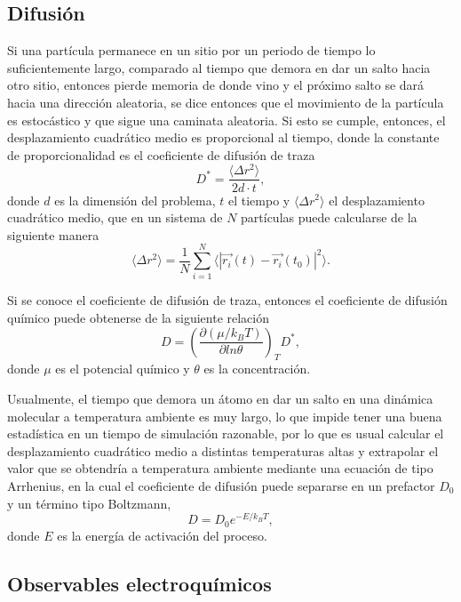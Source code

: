 \subsection{Difusión}

Si una partícula permanece en un sitio por un periodo de tiempo lo 
suficientemente largo, comparado al tiempo que demora en dar un salto hacia otro
sitio, entonces pierde memoria de donde vino y el próximo salto se dará hacia 
una dirección aleatoria, se dice entonces que el movimiento de la partícula es 
estocástico y que sigue una caminata aleatoria. Si esto se cumple, entonces, el 
desplazamiento cuadrático medio es proporcional al tiempo, donde la constante de 
proporcionalidad es el coeficiente de difusión de traza
\begin{equation}
    D^{*} = \frac{\langle \Delta r^2 \rangle}{2d\cdot t},
\end{equation}
donde $d$ es la dimensión del problema, $t$ el tiempo y 
$\langle \Delta r^2 \rangle$ el desplazamiento cuadrático medio, que en un 
sistema de $N$ partículas puede calcularse de la siguiente manera
\begin{equation}
    \langle \Delta r^2 \rangle = \frac{1}{N} \sum_{i=1}^{N} \langle |\vec{r_i}(t) - \vec{r_i}(t_0)|^2 \rangle.
\end{equation}

Si se conoce el coeficiente de difusión de traza, entonces el coeficiente de 
difusión químico puede obtenerse de la siguiente relación ~\cite{gomer1990}
\begin{equation}
    D = \left( \frac{\partial (\mu / k_BT)}{\partial ln \theta} \right)_T D^{*},
\end{equation}
donde $\mu$ es el potencial químico y $\theta$ es la concentración.

Usualmente, el tiempo que demora un átomo en dar un salto en una dinámica 
molecular a temperatura ambiente es muy largo, lo que impide tener una buena 
estadística en un tiempo de simulación razonable, por lo que es usual calcular 
el desplazamiento cuadrático medio a distintas temperaturas altas y extrapolar
el valor que se obtendría a temperatura ambiente mediante una ecuación de tipo 
Arrhenius, en la cual el coeficiente de difusión puede separarse en un 
prefactor $D_0$ y un término tipo Boltzmann,
\begin{equation}
    D = D_0 e^{-E / k_BT},
\end{equation}
donde $E$ es la energía de activación del proceso. 


\subsection{Observables electroquímicos}\label{ss:electrochim}

